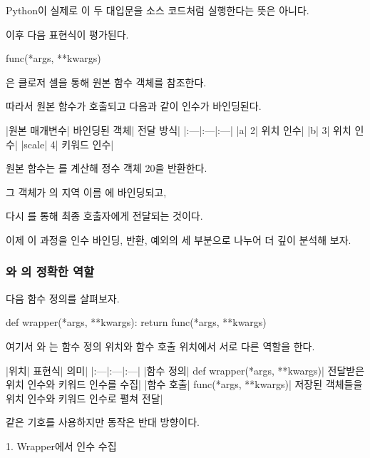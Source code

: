 Python이 실제로 이 두 대입문을 소스 코드처럼 실행한다는 뜻은 아니다.

이후 다음 표현식이 평가된다.

\begin{dhkcode}
func(*args, **kwargs)
\end{dhkcode}

은 클로저 셀을 통해 원본  함수 객체를 참조한다.

따라서 원본 함수가 호출되고 다음과 같이 인수가 바인딩된다.

\begin{dhktable}
|원본 매개변수|	바인딩된 객체|	전달 방식|
|:---|:---|:---|
|a|	2|	위치 인수|
|b|	3|	위치 인수|
|scale|	4|	키워드 인수|
\end{dhktable}

원본 함수는 를 계산해 정수 객체 20을 반환한다.

그 객체가 의 지역 이름 에 바인딩되고,

다시 를 통해 최종 호출자에게 전달되는 것이다.

이제 이 과정을 인수 바인딩, 반환, 예외의 세 부분으로 나누어 더 깊이 분석해 보자.

\subsubsection{와 의 정확한 역할}

다음 함수 정의를 살펴보자.

\begin{dhkcode}
def wrapper(*args, **kwargs):
    return func(*args, **kwargs)
\end{dhkcode}

여기서 와 는 함수 정의 위치와 함수 호출 위치에서 서로 다른 역할을 한다.

\begin{dhktable}
|위치|	표현식|	의미|
|:---|:---|:---|
|함수 정의|	def wrapper(*args, **kwargs)|	전달받은 위치 인수와 키워드 인수를 수집|
|함수 호출|	func(*args, **kwargs)|	저장된 객체들을 위치 인수와 키워드 인수로 펼쳐 전달|
\end{dhktable}

같은 기호를 사용하지만 동작은 반대 방향이다.

\begin{dhknote}
\begin{dhksmry}[centered]
1. Wrapper에서 인수 수집
\end{dhksmry}
\end{dhknote}

